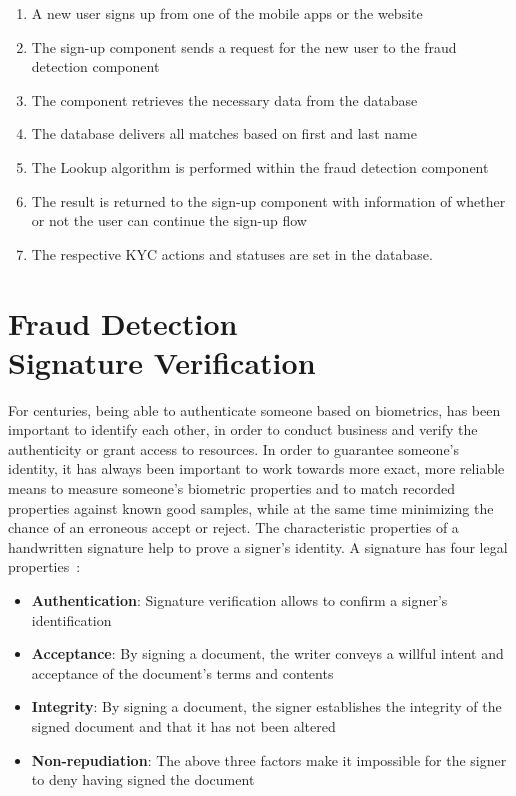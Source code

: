 \documentclass[a4paper, oneside]{csthesis}
\begin{document}
\begin{enumerate}
\item A new user signs up from one of the mobile apps or the website
\item The sign-up component sends a request for the new user to the fraud detection component
\item The component retrieves the necessary data from the database
\item The database delivers all matches based on first and last name
\item The Lookup algorithm is performed within the fraud detection component
\item The result is returned to the sign-up component with information of whether or not the user can continue the sign-up flow
\item The respective KYC actions and statuses are set in the database.
\end{enumerate}












\chapter{Fraud Detection \\Signature Verification}
\label{chp:signature-verification}

For centuries, being able to authenticate someone based on biometrics, has been important to identify each other, in order to conduct business and verify the authenticity or grant access to resources. In order to guarantee someone's identity, it has always been important to work towards more exact, more reliable means to measure someone's biometric properties and to match recorded properties against known good samples, while at the same time minimizing the chance of an erroneous accept or reject. The characteristic properties of a handwritten signature help to prove a signer's identity. A signature has four legal properties~\cite{Hanmandlu05}:

\begin{itemize}
\item \textbf{Authentication}: Signature verification allows to confirm a signer's identification
\item \textbf{Acceptance}: By signing a document, the writer conveys a willful intent and acceptance of the document's terms and contents
\item \textbf{Integrity}: By signing a document, the signer establishes the integrity of the signed document and that it has not been altered
\item \textbf{Non-repudiation}: The above three factors make it impossible for the signer to deny having signed the document
\end{itemize}
\end{document}
